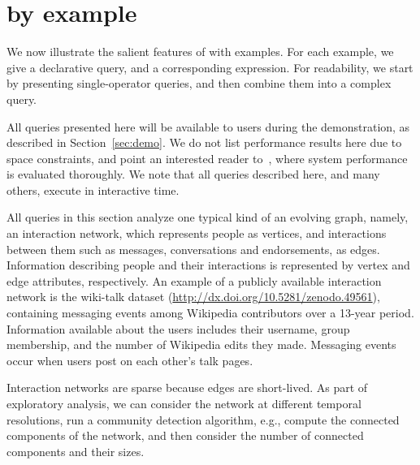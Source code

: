 \section{\ql by example}
\label{sec:cases}

We now illustrate the salient features of \ql with examples.  For each
example, we give a declarative query, and a corresponding \tga
expression.  For readability, we start by presenting single-operator
queries, and then combine them into a complex query.

All queries presented here will be available to \sys users during the
demonstration, as described in Section~\ref{sec:demo}.  We do not list
performance results here due to space constraints, and point an
interested reader to~\cite{PortalarXiv2016}, where system performance
is evaluated thoroughly.  We note that all queries described here, and
many others, execute in interactive time.

All queries in this section analyze one typical kind of an evolving
graph, namely, an interaction network, which represents people as
vertices, and interactions between them such as messages,
conversations and endorsements, as edges.  Information describing
people and their interactions is represented by vertex and edge
attributes, respectively.  An example of a publicly available
interaction network is the wiki-talk dataset
(\url{http://dx.doi.org/10.5281/zenodo.49561}), containing messaging
events among Wikipedia contributors over a 13-year period.
Information available about the users includes their username, group
membership, and the number of Wikipedia edits they made.  Messaging
events occur when users post on each other's talk pages.

Interaction networks are sparse because edges are short-lived.  As
part of exploratory analysis, we can consider the network at different
temporal resolutions, run a community detection algorithm, e.g.,
compute the connected components of the network, and then consider the
number of connected components and their sizes.  



